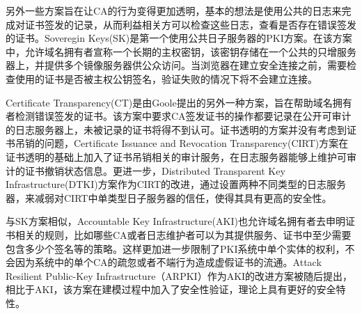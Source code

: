 另外一些方案旨在让CA的行为变得更加透明，基本的想法是使用公共的日志来完成对证书签发的记录，从而利益相关方可以检查这些日志，查看是否存在错误签发的证书。Soveregin Keys(SK)\supercite{eckersley2012internet}是第一个使用公共日子服务器的PKI方案。在该方案中，允许域名拥有者宣称一个长期的主权密钥，该密钥存储在一个公共的只增服务器上，并提供多个镜像服务器供公众访问。当浏览器在建立安全连接之前，需要检查使用的证书是否被主权公钥签名，验证失败的情况下将不会建立连接。

Certificate Transparency(CT)\supercite{laurie2013certificate}是由Goole提出的另外一种方案，旨在帮助域名拥有者检测错误签发的证书。该方案中要求CA签发证书的操作都要记录在公开可审计的日志服务器上，未被记录的证书将得不到认可。证书透明的方案并没有考虑到证书吊销的问题，Certificate Issuance and Revocation Transparency(CIRT)\supercite{ryan2014enhanced}方案在证书透明的基础上加入了证书吊销相关的审计服务，在日志服务器能够上维护可审计的证书撤销状态信息。更进一步，Distributed Transparent Key Infrastructure(DTKI)\supercite{cheval2014dtki}方案作为CIRT的改进，通过设置两种不同类型的日志服务器，来减弱对CIRT中单类型日子服务器的信任，使得其具有更高的安全性。


与SK方案相似，Accountable Key Infrastructure(AKI)\supercite{kim2013accountable}也允许域名拥有者去申明证书相关的规则，比如哪些CA或者日志维护者可以为其提供服务、证书中至少需要包含多少个签名等的策略。这样更加进一步限制了PKI系统中单个实体的权利，不会因为系统中的单个CA的疏忽或者不端行为造成虚假证书的流通。Attack Resilient Public-Key Infrastructure（ARPKI）\supercite{basin2014arpki}作为AKI的改进方案被随后提出，相比于AKI，该方案在建模过程中加入了安全性验证，理论上具有更好的安全特性。

%


